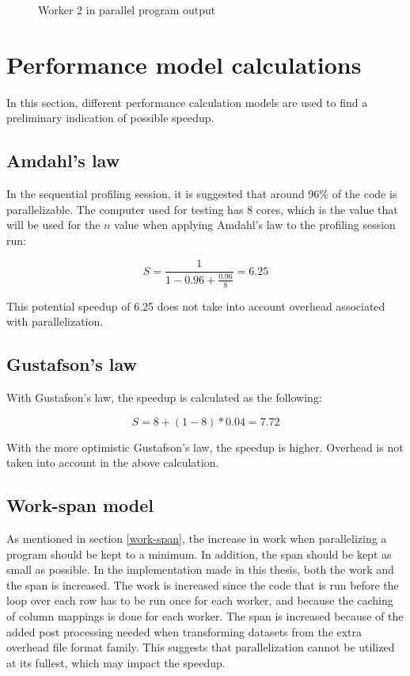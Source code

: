 \begin{figure}[ht]
  
  \caption{Worker 2 in parallel program  output}
  \label{fig:parallel_profiler_w2}
\end{figure}
\clearpage

\section{Performance model calculations}
In this section, different performance calculation models are used to find a preliminary
indication of possible speedup.

\subsection{Amdahl's law}
In the sequential profiling session, it is suggested that around 96\% of the code is parallelizable. The computer used for testing has 8 cores,
which is the value that will be used for the $n$ value when applying Amdahl's law to the profiling session run:

\begin{displaymath}
  S = \frac{1}{1 - 0.96 + \frac{0.96}{8}} = 6.25
  \label{fig:amdahl_calculation}
\end{displaymath}

\noindent This potential speedup of 6.25 does not take into account overhead associated with parallelization.

\subsection{Gustafson's law}
With Gustafson's law, the speedup is calculated as the following:

\begin{displaymath}
  S = 8 + (1-8) * 0.04 = 7.72
\end{displaymath}

\noindent With the more optimistic Gustafson's law, the speedup is higher. Overhead is not taken into account in the above calculation.

\subsection{Work-span model}
As mentioned in section \ref{work-span}, the increase in work when parallelizing a program should be kept to a minimum.
In addition, the span should be kept as small as possible. In the implementation made in this thesis, both the work and the span is increased.
The work is increased since the code that is run before the loop over each row has to be run once for each worker, and because the caching of
column mappings is done for each worker. The span is increased because of the added post processing needed when transforming datasets from the
extra overhead file format family. This suggests that parallelization cannot be utilized at its fullest, which may impact the speedup.

